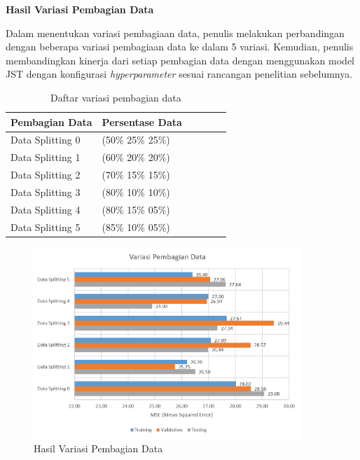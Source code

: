 \noindent \textbf{Hasil Variasi Pembagian Data} 

Dalam menentukan variasi pembagiaan data, penulis melakukan perbandingan dengan beberapa variasi pembagiaan data ke dalam 5 variasi. Kemudian, penulis membandingkan kinerja dari setiap pembagian data dengan menggunakan model JST dengan konfigurasi \textit{hyperparameter} sesuai rancangan penelitian sebelumnya\cite{skripsiTanto}.
\begin{table}[h!]
	\caption{Daftar variasi pembagian data}
	\label{tbl:5:DataSplitting}
	\centering
	\begin{tabular}{|p{3cm}|p{3cm}|p{1.5cm}|p{1cm}|p{1.5cm}|p{1cm}|}
		\hline
		Pembagian Data   & Persentase Data \\ \hline
		Data Splitting 0 & (50\% 25\% 25\%)\\ \hline
		Data Splitting 1 & (60\% 20\% 20\%)\\ \hline
		Data Splitting 2 & (70\% 15\% 15\%)\\ \hline
		Data Splitting 3 & (80\% 10\% 10\%)\\ \hline
		Data Splitting 4 & (80\% 15\% 05\%)\\ \hline
		Data Splitting 5 & (85\% 10\% 05\%)\\ \hline
	\end{tabular}
\end{table}

\begin{figure}[!h]
	\centering
	\includegraphics[width=0.9\textwidth]{figures/DataSplittingResult}
	\caption{Hasil Variasi Pembagian Data}
	\label{fig:5:DataSplittingResult}
\end{figure}

